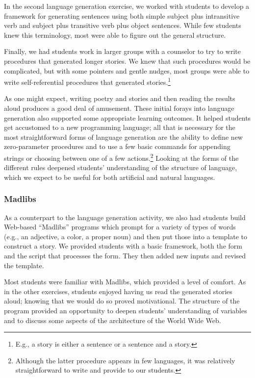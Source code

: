 In the second language generation exercise, we worked with students
to develop a framework for generating sentences using both simple
subject plus intransitive verb and subject plus transitive verb
plus object sentences.  While few students knew this terminology,
most were able to figure out the general structure.

Finally, we had students work in larger groups with a counselor to
try to write procedures that generated longer stories.    We knew
that such procedures would be complicated, but with some pointers
and gentle nudges, most groups were able to write self-referential
procedures that generated stories.\footnote{E.g., a story is either
a sentence or a sentence and a story.}

As one might expect, writing poetry and stories and then reading
the results aloud produces a good deal of amusement.  These initial
forays into language generation also supported some appropriate
learning outcomes.  It helped students get accustomed to a new
programming language; all that is necessary for the most straightforward
forms of language generation are the ability to define new zero-parameter
procedures and to use a few basic commands for appending strings
or choosing between one of a few actions.\footnote{Although the
latter procedure appears in few languages, it was relatively
straightforward to write and provide to our students.}   Looking
at the forms of the different rules deepened students' understanding
of the structure of language, which we expect to be useful for both
artificial and natural languages.

\subsubsection{Madlibs}

As a counterpart to the language generation activity, we also had students
build Web-based ``Madlibs'' programs which prompt for a variety of types
of words (e.g., an adjective, a color, a proper noun) and then put those
into a template to construct a story.  We provided students with a basic
framework, both the form and the script that processes the form.  They
then added new inputs and revised the template.

Most students were familiar with Madlibs, which provided a level
of comfort. As in the other exercises, students enjoyed having us
read the generated stories aloud;  knowing that we would do so
proved motivational.  The structure of the program
provided an opportunity to deepen students' understanding of variables
and to discuss some aspects of the architecture of the World Wide
Web.

